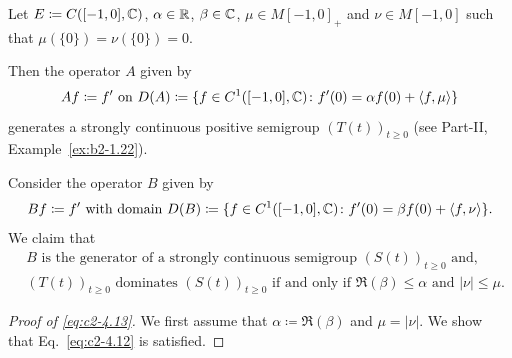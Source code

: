 \begin{example}\label{ex:c2-4.14}
Let $E \coloneq C([-1,0],\mathbb{C})$, $\alpha \in \mathbb{R}$, $\beta \in \mathbb{C}$, $\mu \in M[-1,0]_{+}$
and $\nu \in M[-1,0]$ such that $\mu(\{0\}) = \nu(\{0\}) = 0$.

Then the operator $A$ given by 
\[
Af \coloneq f' \text{ on } D(A) \coloneq \{f \in C^{1}([-1,0],\mathbb{C}) \colon f'(0) = \alpha f(0) + \langle f,\mu\rangle\}
\]
generates a strongly continuous positive semigroup $(T(t))_{t \geq 0}$ 
(see Part-II, Example~\ref{ex:b2-1.22}).

Consider the operator $B$ given by
\[Bf \coloneq f' \text{ with domain } D(B) \coloneq \{f \in C^{1}([-1,0],\mathbb{C}) \colon f'(0) = \beta f(0) + \langle f,\nu \rangle\}.
\]
We claim that
\begin{equation}\label{eq:c2-4.13}
\begin{split}
& B  \text{ is the generator of a strongly continuous semigroup } (S(t))_{t \geq 0}  
\text{ and, } \\ 
&(T(t))_{t \geq 0} \text{ dominates } (S(t))_{t \geq 0} 
\text{ if and only if } \Re(\beta) \leq \alpha \text{ and } |\nu| \leq \mu .
\end{split} 
\end{equation}
\begin{proof}[Proof of \eqref{eq:c2-4.13}]
We first assume that $\alpha \coloneq \Re(\beta)$ and $\mu = |\nu|$.
We show that Eq.~\eqref{eq:c2-4.12} is satisfied.


\end{proof}
\end{example}
